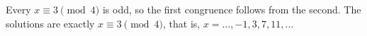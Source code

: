 Every $x\equiv3\pmod4$ is odd, so the first congruence follows from the second. The solutions are exactly $\boxed{x\equiv3\pmod4}$, that is, $x=\dots,-1,3,7,11,\dots$
